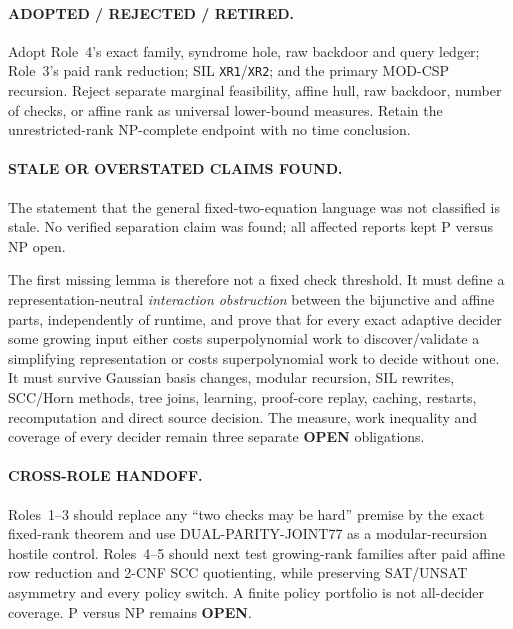 \documentclass[11pt]{article}
\newcommand{\OPEN}{\textbf{OPEN}}
\begin{document}
\paragraph{ADOPTED / REJECTED / RETIRED.}
Adopt Role~4's exact family, syndrome hole, raw backdoor and query ledger;
Role~3's paid rank reduction; SIL \texttt{XR1}/\texttt{XR2}; and the primary
MOD-CSP recursion.  Reject separate marginal feasibility, affine hull, raw
backdoor, number of checks, or affine rank as universal lower-bound measures.
Retain the unrestricted-rank NP-complete endpoint with no time conclusion.
\paragraph{STALE OR OVERSTATED CLAIMS FOUND.}
The statement that the general fixed-two-equation language was not classified
is stale.  No verified separation claim was found; all affected reports kept
P versus NP open.

The first missing lemma is therefore not a fixed check threshold.  It must
define a representation-neutral \emph{interaction obstruction} between the
bijunctive and affine parts, independently of runtime, and prove that for
every exact adaptive decider some growing input either costs
superpolynomial work to discover/validate a simplifying representation or
costs superpolynomial work to decide without one.  It must survive Gaussian
basis changes, modular recursion, SIL rewrites, SCC/Horn methods, tree joins,
learning, proof-core replay, caching, restarts, recomputation and direct
source decision.  The measure, work inequality and coverage of every decider
remain three separate \OPEN{} obligations.

\paragraph{CROSS-ROLE HANDOFF.}
Roles~1--3 should replace any ``two checks may be hard'' premise by the exact
fixed-rank theorem and use DUAL-PARITY-JOINT77 as a modular-recursion hostile
control.  Roles~4--5 should next test growing-rank families after paid affine
row reduction and 2-CNF SCC quotienting, while preserving SAT/UNSAT asymmetry
and every policy switch.  A finite policy portfolio is not all-decider
coverage.  P versus NP remains \OPEN.
\end{document}
